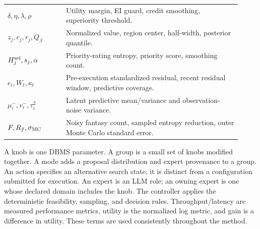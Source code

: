 \begin{table}[htbp]
\begin{tabular}{>{\raggedright\arraybackslash}p{0.23\linewidth}>{\raggedright\arraybackslash}p{0.69\linewidth}}
$\delta,\eta,\lambda,\rho$ & Utility margin, EI guard, credit smoothing, superiority threshold. \\
$z_j,c_j,r_j,Q_\beta$ & Normalized value, region center, half-width, posterior quantile. \\
$H_j^{\rm sel},s_j,\alpha$ & Priority-rating entropy, priority score, smoothing count. \\
$e_i,W_t,\kappa_t$ & Pre-execution standardized residual, recent residual window, predictive coverage. \\
$\mu_i^-,v_i^-,\tau_i^2$ & Latent predictive mean/variance and observation-noise variance. \\
$F,R_f,\sigma_{\rm MC}$ & Noisy fantasy count, sampled entropy reduction, outer Monte Carlo standard error. \\
\bottomrule
\end{tabular}
\end{table}

A knob is one DBMS parameter. A group is a small set of knobs modified
together. A mode adds a proposal distribution and expert provenance to a
group. An action specifies an alternative search state; it is distinct
from a configuration submitted for execution. An expert is an LLM role;
an owning expert is one whose declared domain includes the knob. The
controller applies the deterministic feasibility, sampling, and decision
rules. Throughput/latency are measured performance metrics, utility is the
normalized log metric, and gain is a difference in utility. These terms
are used consistently throughout the method.

